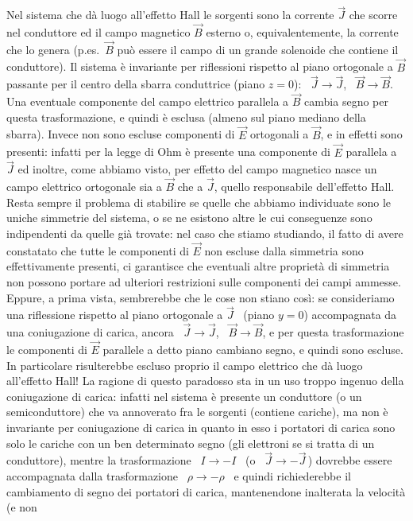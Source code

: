 Nel sistema che d\`a luogo all'effetto Hall le sorgenti sono la corrente
$\vec J$ che scorre nel conduttore ed il campo magnetico $\vec B$ esterno o,
equivalentemente, la corrente che lo genera (p.es.\ $\vec B$ pu\`o essere il
campo di un grande solenoide che contiene il conduttore). Il sistema \`e
invariante per riflessioni rispetto al piano ortogonale a $\vec B$ passante per
il centro della sbarra conduttrice (piano $z=0$): \ $\vec J\to\vec J$,
\ $\vec B\to\vec B$. Una eventuale componente del campo elettrico parallela a
$\vec B$ cambia segno per questa trasformazione, e quindi \`e esclusa (almeno
sul piano mediano della sbarra). Invece non sono escluse componenti di $\vec E$
ortogonali a $\vec B$, e in effetti sono presenti: infatti per la legge di Ohm
\`e presente una componente di $\vec E$ parallela a $\vec J$ ed inoltre, come
abbiamo visto, per effetto del campo magnetico nasce un campo elettrico
ortogonale sia a $\vec B$ che a $\vec J$, quello responsabile dell'effetto
Hall.\\
Resta sempre il problema di stabilire se quelle che abbiamo individuate sono le
uniche simmetrie del sistema, o se ne esistono altre le cui conseguenze sono
indipendenti da quelle gi\`a trovate: nel caso che stiamo studiando, il fatto di
avere constatato che tutte le componenti di $\vec E$ non escluse dalla simmetria
sono effettivamente presenti, ci garantisce
che eventuali altre propriet\`a di simmetria non possono portare ad ulteriori
restrizioni sulle componenti dei campi ammesse. Eppure, a prima vista,
sembrerebbe che le cose non stiano cos\`i: se consideriamo una riflessione
rispetto al piano ortogonale a $\vec J$ \ (piano $y=0$) accompagnata da una
coniugazione di carica, ancora \ $\vec J\to\vec J$, \ $\vec B\to\vec B$, e per
questa trasformazione le componenti di $\vec E$ parallele a detto piano cambiano
segno, e quindi sono escluse. In particolare risulterebbe escluso proprio il
campo elettrico che d\`a luogo all'effetto Hall! La ragione di questo paradosso
sta in un uso troppo ingenuo della coniugazione di carica: infatti nel sistema
\`e presente un conduttore (o un semiconduttore) che va annoverato fra le
sorgenti (contiene cariche), ma non \`e invariante per coniugazione di carica in
quanto in esso i portatori di carica sono solo le cariche con un ben determinato
segno (gli elettroni se si tratta di un conduttore), mentre la trasformazione
\ $I\to-I$ \ \big(o \ $\vec J\to-\vec J$\,\big) dovrebbe essere accompagnata
dalla trasformazione \ $\rho\to-\rho$ \ e quindi richiederebbe il cambiamento di
segno dei portatori di carica, mantenendone inalterata la velocit\`a (e non

